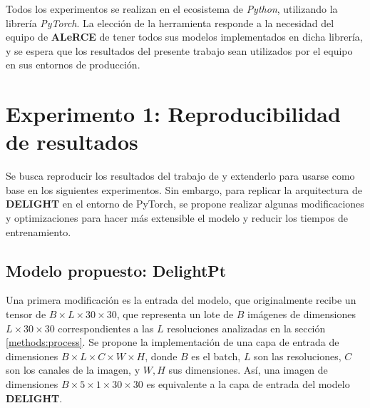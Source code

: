 \documentclass[../tesis.tex]{subfiles}
\begin{document}
Todos los experimentos se realizan en el ecosistema de \textit{Python}, utilizando la librería \textit{PyTorch}. La elección de la herramienta responde a la necesidad del equipo de \textbf{ALeRCE} de tener todos sus modelos implementados en dicha librería, y se espera que los resultados del presente trabajo sean utilizados por el equipo en sus entornos de producción.\par\null\par

\section{Experimento 1: Reproducibilidad de resultados} \label{methods:replication}
Se busca reproducir los resultados del trabajo de \cite{delight} y extenderlo para usarse como base en los siguientes experimentos. Sin embargo, para replicar la arquitectura de \textbf{DELIGHT} en el entorno de PyTorch, se propone realizar algunas modificaciones y optimizaciones para hacer más extensible el modelo y reducir los tiempos de entrenamiento.\par\null\par

\subsection{Modelo propuesto: DelightPt}

Una primera modificación es la entrada del modelo, que originalmente recibe un tensor de $B\times L\times30\times30$, que representa un lote de $B$ imágenes de dimensiones $L\times30\times30$ correspondientes a las $L$ resoluciones analizadas en la sección \ref{methods:process}. Se propone la implementación de una capa de entrada de dimensiones $B\times L\times C\times W\times H$, donde $B$ es el batch, $L$ son las resoluciones, $C$ son los canales de la imagen, y $W,H$ sus dimensiones. Así, una imagen de dimensiones $B\times5\times1\times30\times30$ es equivalente a la capa de entrada del modelo \textbf{DELIGHT}.\par\null\par
\end{document}
